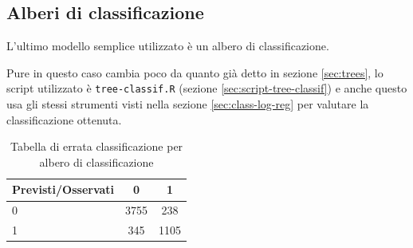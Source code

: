 \subsection{Alberi di classificazione}\label{sec:class-tree}

L'ultimo modello semplice utilizzato è un albero di classificazione.

Pure in questo caso cambia poco da quanto già detto in sezione
\ref{sec:trees}, lo script utilizzato è \texttt{tree-classif.R} (sezione
\ref{sec:script-tree-classif}) e anche questo usa gli stessi strumenti visti
nella sezione \ref{sec:class-log-reg} per valutare la classificazione ottenuta.

\begin{table}[H]
\begin{center}
\begin{tabular}{ | l || c | c | }
  \hline
    Previsti/Osservati & 0 & 1 \\ \hline \hline
    0 & 3755 & 238 \\ \hline
    1 & 345 & 1105 \\ \hline
\end{tabular}
  \caption{Tabella di errata classificazione per albero di classificazione}
\end{center}
\end{table}


